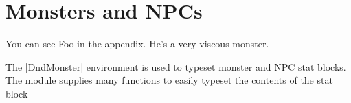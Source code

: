 \chapter{Monsters and NPCs}
\label{p:1:ch:3}

You can see \Gls{Foo} in the appendix. He's a very viscous monster.

The |DndMonster| environment is used to typeset monster and NPC stat blocks. The module supplies many functions to easily typeset the contents of the stat block